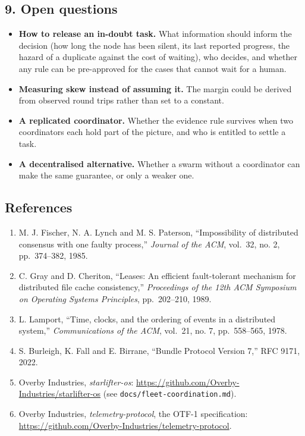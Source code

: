 \documentclass[
  12pt,
  letterpaper,
]{article}
\providecommand{\tightlist}{%
  \setlength{\itemsep}{0pt}\setlength{\parskip}{0pt}}
\begin{document}
\hypertarget{open-questions}{%
\subsection{9. Open questions}\label{open-questions}}

\begin{itemize}
\tightlist
\item
  \textbf{How to release an in-doubt task.} What information should
  inform the decision (how long the node has been silent, its last
  reported progress, the hazard of a duplicate against the cost of
  waiting), who decides, and whether any rule can be pre-approved for
  the cases that cannot wait for a human.
\item
  \textbf{Measuring skew instead of assuming it.} The margin could be
  derived from observed round trips rather than set to a constant.
\item
  \textbf{A replicated coordinator.} Whether the evidence rule survives
  when two coordinators each hold part of the picture, and who is
  entitled to settle a task.
\item
  \textbf{A decentralised alternative.} Whether a swarm without a
  coordinator can make the same guarantee, or only a weaker one.
\end{itemize}

\hypertarget{references}{%
\subsection{References}\label{references}}

\begin{enumerate}
\def\labelenumi{\arabic{enumi}.}
\tightlist
\item
  M. J. Fischer, N. A. Lynch and M. S. Paterson, ``Impossibility of
  distributed consensus with one faulty process,'' \emph{Journal of the
  ACM}, vol.~32, no. 2, pp.~374--382, 1985.
\item
  C. Gray and D. Cheriton, ``Leases: An efficient fault-tolerant
  mechanism for distributed file cache consistency,'' \emph{Proceedings
  of the 12th ACM Symposium on Operating Systems Principles},
  pp.~202--210, 1989.
\item
  L. Lamport, ``Time, clocks, and the ordering of events in a
  distributed system,'' \emph{Communications of the ACM}, vol.~21, no.
  7, pp.~558--565, 1978.
\item
  S. Burleigh, K. Fall and E. Birrane, ``Bundle Protocol Version 7,''
  RFC 9171, 2022.
\item
  Overby Industries, \emph{starlifter-os}:
  \url{https://github.com/Overby-Industries/starlifter-os} (see
  \texttt{docs/fleet-coordination.md}).
\item
  Overby Industries, \emph{telemetry-protocol}, the OTF-1 specification:
  \url{https://github.com/Overby-Industries/telemetry-protocol}.
\end{enumerate}
\end{document}
